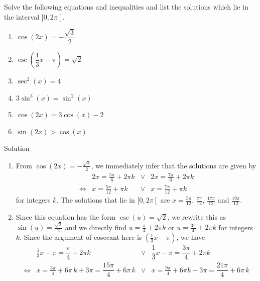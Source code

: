 \pagebreak
\begin{example}  \label{TrigEqnEx1} Solve the following equations and inequalities and list the solutions which lie in the interval $[0,2\pi\left[\right.$.
	
	
	\begin{multicols}{2}
		
		\begin{enumerate}
			
			\item  $\cos(2x) = -\dfrac{\sqrt{3}}{2}$
			\item  $\csc\left(\dfrac{1}{3}x-\pi \right) = \sqrt{2}$
			\item  $\sec^{2}(x) = 4$
			\item  $3\sin^{3}(x) = \sin^{2}(x)$
			\item   $\cos(2x) = 3\cos(x) - 2$
			\item  $\sin(2x) > \cos(x)$
		\end{enumerate}
		
	\end{multicols}
	
	Solution 
	
	\begin{enumerate}
		
		\item  From $\cos(2x) =-\frac{\sqrt{3}}{2}$, we immediately infer that the solutions are given by 
		$$
		\begin{array}{rrcl}
		     &2x = \frac{5\pi}{6} + 2\pi k&\vee&2x = \frac{7\pi}{6} + 2\pi k \\
		    \Leftrightarrow&x = \frac{5\pi}{12} + \pi k &\vee&x = \frac{7\pi}{12} + \pi k
		\end{array}
		$$
		for integers $k$.  The solutions that lie in $[0,2\pi\left[\right.$ are  $x = \frac{5\pi}{12}$,  $\frac{7\pi}{12}$, $\frac{17\pi}{12}$ and $\frac{19\pi}{12}$.  
		
		\item  Since this equation has the form $\csc(u) = \sqrt{2}$, we rewrite this as $\sin(u) = \frac{\sqrt{2}}{2}$ and we directly find $u = \frac{\pi}{4} + 2\pi k$ or $u = \frac{3\pi}{4} + 2\pi  k$ for integers $k$.  Since the argument of cosecant here is $\left(\frac{1}{3}x-\pi \right)$, we have
			$$
		\begin{array}{rrcl}
		     &\frac{1}{3}x-\pi = \dfrac{\pi}{4} + 2\pi k&\vee&\dfrac{1}{3}x-\pi = \dfrac{3\pi}{4} + 2\pi k \\[0.2cm]
		    \Leftrightarrow&x = \frac{3\pi}{4}+6\pi\,k+3\pi =\dfrac{15\pi}{4}+6\pi\,k&\vee&x = \frac{9\pi}{4} + 6\pi k+3\pi=\dfrac{21\pi}{4}+6\pi\,k
		\end{array}
		$$
		

\end{enumerate}
\end{example}
